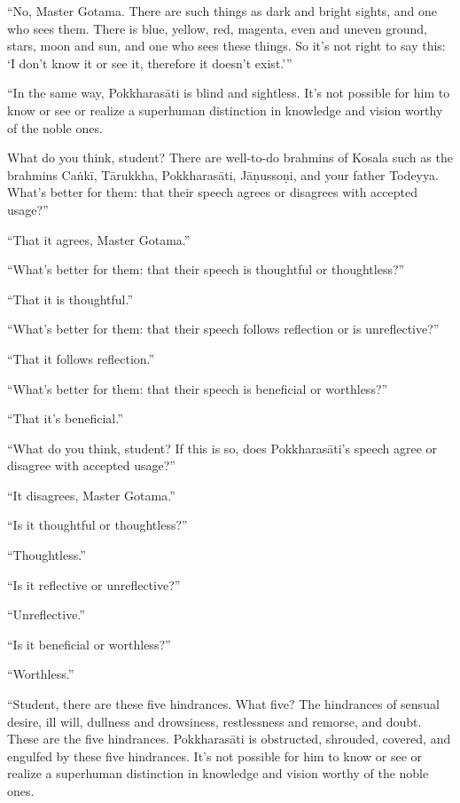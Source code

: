 \documentclass[12pt,openany]{book}%
\begin{document}
“No, Master Gotama. There are such things as dark and bright sights, and one who sees them. There is blue, yellow, red, magenta, even and uneven ground, stars, moon and sun, and one who sees these things. So it’s not right to say this: ‘I don’t know it or see it, therefore it doesn’t exist.’” 

“In the same way, \textsanskrit{Pokkharasāti} is blind and sightless. It’s not possible for him to know or see or realize a superhuman distinction in knowledge and vision worthy of the noble ones. 

What do you think, student? There are well-to-do brahmins of Kosala such as the brahmins \textsanskrit{Caṅkī}, \textsanskrit{Tārukkha}, \textsanskrit{Pokkharasāti}, \textsanskrit{Jāṇussoṇi}, and your father Todeyya. What’s better for them: that their speech agrees or disagrees with accepted usage?” 

“That it agrees, Master Gotama.” 

“What’s better for them: that their speech is thoughtful or thoughtless?” 

“That it is thoughtful.” 

“What’s better for them: that their speech follows reflection or is unreflective?” 

“That it follows reflection.” 

“What’s better for them: that their speech is beneficial or worthless?” 

“That it’s beneficial.” 

“What do you think, student? If this is so, does \textsanskrit{Pokkharasāti}’s speech agree or disagree with accepted usage?” 

“It disagrees, Master Gotama.” 

“Is it thoughtful or thoughtless?” 

“Thoughtless.” 

“Is it reflective or unreflective?” 

“Unreflective.” 

“Is it beneficial or worthless?” 

“Worthless.” 

“Student, there are these five hindrances. What five? The hindrances of sensual desire, ill will, dullness and drowsiness, restlessness and remorse, and doubt. These are the five hindrances. \textsanskrit{Pokkharasāti} is obstructed, shrouded, covered, and engulfed by these five hindrances. It’s not possible for him to know or see or realize a superhuman distinction in knowledge and vision worthy of the noble ones. 
\end{document}
